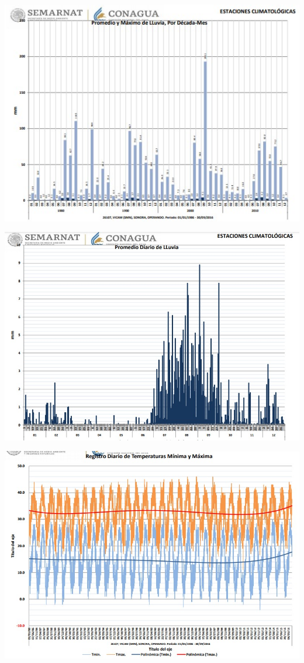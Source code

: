 \documentclass{article}
\begin{document}
\newpage
\begin{figure1}
\includegraphics[width=15cm]{5.jpg} 
\end{figure1}
\newpage
\begin{figure1}
\includegraphics[width=15cm]{6.jpg} 
\end{figure1}
\newpage
\begin{figure1}
\includegraphics[width=15cm]{7.jpg} 
\end{figure1}
\newpage
\end{document}
